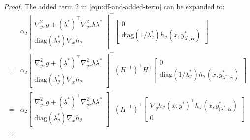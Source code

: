 \begin{proof}
The added term 2 in \cref{eqn:df-and-added-term} can be expanded to: 
\begin{align}
    & \alpha_2 \begin{bmatrix}
        \nabla^2_{yx} g + (\lambda^*)^\top \nabla_{yx}^2 h \lambda^* \\
        \text{diag}(\lambda^*_\mathcal{I}) \nabla_x h_\mathcal{I}
    \end{bmatrix}^\top \begin{bmatrix}
        0 \\
        \text{diag}(1/\lambda^*_\mathcal{I}) h_\mathcal{I}(x,y_{\lambda^*,\boldsymbol{\alpha}}^*) 
    \end{bmatrix} \nonumber \\
    = & \alpha_2 \begin{bmatrix}
        \nabla^2_{yx} g + (\lambda^*)^\top \nabla_{yx}^2 h \lambda^* \\
        \text{diag}(\lambda^*_\mathcal{I}) \nabla_x h_\mathcal{I}
    \end{bmatrix}^\top (H^{-1})^\top H^\top  \begin{bmatrix}
        0 \\
        \text{diag}(1/\lambda^*_\mathcal{I}) h_\mathcal{I}(x,y_{\lambda^*,\boldsymbol{\alpha}}^*) 
    \end{bmatrix} \nonumber \\
    = & \alpha_2  \begin{bmatrix}
        \nabla^2_{yx} g + (\lambda^*)^\top \nabla_{yx}^2 h \lambda^* \\
        \text{diag}(\lambda^*_\mathcal{I}) \nabla_x h_\mathcal{I}
    \end{bmatrix}^\top (H^{-1})^\top \begin{bmatrix}
        \nabla_y h_\mathcal{I}(x,y^*)^\top h_\mathcal{I}(x,y_{(\lambda^*,\boldsymbol{\alpha}}^*) \\
        0
    \end{bmatrix} \label{eqn:added-term-2}
\end{align}
    

\end{proof}
